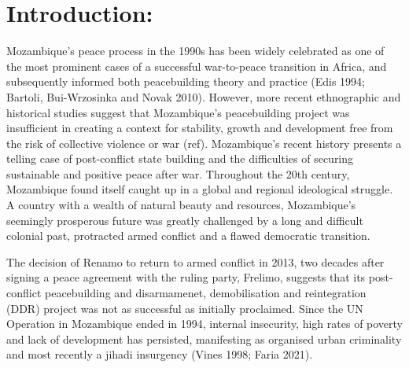 \chapter{Introduction: }
\label{chp:DEM}


Mozambique's peace process in the 1990s has been widely celebrated as one of the most prominent cases of a successful war-to-peace transition in Africa, and subsequently informed both peacebuilding theory and practice (Edis 1994; Bartoli, Bui-Wrzosinka and Novak 2010). However, more recent ethnographic and historical studies suggest that Mozambique's peacebuilding project was insufficient in creating a context for stability, growth and development free from the risk of collective violence or war (ref). Mozambique's recent history presents a telling case of post-conflict state building and the difficulties of securing sustainable and positive peace after war. Throughout the 20th century, Mozambique found itself caught up in a global and regional ideological struggle. A country with a wealth of natural beauty and resources, Mozambique's seemingly prosperous future was greatly challenged by a long and difficult colonial past, protracted armed conflict and a flawed democratic transition. 

The decision of Renamo to return to armed conflict in 2013, two decades after signing a peace agreement with the ruling party, Frelimo, suggests that its post-conflict peacebuilding and disarmamenet, demobilisation and reintegration (DDR) project was not as successful as initially proclaimed. Since the UN Operation in Mozambique ended in 1994, internal insecurity, high rates of poverty and lack of development has persisted, manifesting as organised urban criminality and most recently a jihadi insurgency (Vines 1998; Faria 2021). 


